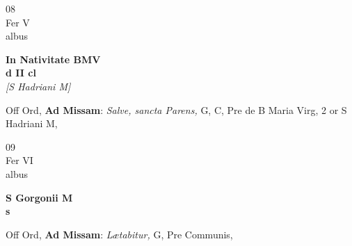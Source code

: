 \documentclass[10pt, openany]{book}
\begin{document}
        \begin{center}
            \begin{minipage}{3.5in}
                \vspace{2em}
                \begin{minipage}{0.5in}
                    {\Huge 08} \\
                    {\normalsize Fer V} \\
                    {\normalsize albus}
                \end{minipage}
                \begin{minipage}{3.0in}
                    \textbf{ \large In Nativitate BMV \\
                    \textnormal{\normalsize d II cl}} \\ \textit{[S Hadriani M]} \\ 
                \end{minipage}
                \begin{justify}Off Ord, \textbf{Ad Missam}: \textit{Salve, sancta Parens,} G, C, Pre de B Maria Virg, 2 or S Hadriani M,  
                \end{justify}
            \end{minipage}
        \end{center}
    
        \begin{center}
            \begin{minipage}{3.5in}
                \vspace{2em}
                \begin{minipage}{0.5in}
                    {\Huge 09} \\
                    {\normalsize Fer VI} \\
                    {\normalsize albus}
                \end{minipage}
                \begin{minipage}{3.0in}
                    \textbf{ \large S Gorgonii M \\
                    \textnormal{\normalsize s}} \\ 
                \end{minipage}
                \begin{justify}Off Ord, \textbf{Ad Missam}: \textit{Lætabitur,} G, Pre Communis,  
                \end{justify}
            \end{minipage}
        \end{center}
    
\end{document}
